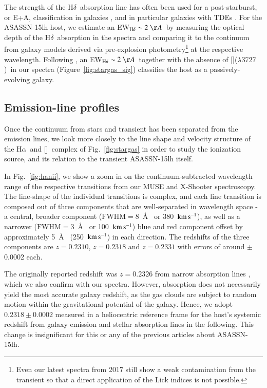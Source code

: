 \documentclass[traditabstract]{aa}
\newcommand{\kms}{$\rm{km\,s^{-1}}$}
\newcommand{\ha}{H$\alpha$}
\newcommand{\hd}{H$\delta$}
\newcommand{\oii}{[\ion{O}{ii}]}
\newcommand{\nii}{[\ion{N}{ii}]}
\begin{document}
The strength of the \hd~absorption line has often been used for a post-starburst, or E+A, classification in galaxies \citep{1999ApJS..122...51D, 1997ApJS..111..377W}, and in particular galaxies with TDEs \citep[e.g.,][]{2014ApJ...793...38A, 2016ApJ...818L..21F, 2017arXiv170701559L}. For the ASASSN-15lh host, we estimate an EW$_{\mathrm{H}\delta}\sim 2~\AA$~by measuring the optical depth of the \hd~absorption in the spectra and comparing it to the continuum from galaxy models derived via pre-explosion photometry\footnote{Even our latest spectra from 2017 still show a weak contamination from the transient so that a direct application of the Lick indices is not possible.} at the respective wavelength. Following \citet{1992ApJS...78....1D}, an EW$_{\mathrm{H}\delta}\sim2~\AA$~together with the absence of \oii($\lambda 3727$)~in our spectra (Figure~\ref{fig:stargas_sig}) classifies the host as a passively-evolving galaxy.



\subsection{Emission-line profiles}
\label{sec:prof}

Once the continuum from stars and transient has been separated from the emission lines, we look more closely to the line shape and velocity structure of the \ha\, and \nii\, complex of Fig.~\ref{fig:stargas} in order to study the ionization source, and its relation to the transient ASASSN-15lh itself.

In Fig.~\ref{fig:hanii}, we show a zoom in on the continuum-subtracted wavelength range of the respective transitions from our MUSE and X-Shooter spectroscopy. The line-shape of the individual transitions is complex, and each line transition is composed out of three components that are well-separated in wavelength space - a central, broader component ($\mathrm{FWHM}=8$~\AA~ or 380~\kms), as well as a narrower ($\mathrm{FWHM}=3$~\AA~ or 100~\kms) blue and red component offset by approximately 5~\AA~ (250~\kms) in each direction. The redshifts of the three components are $z=0.2310$, $z=0.2318$ and $z=0.2331$ with errors of around $\pm$0.0002 each. 

The originally reported redshift was $z=0.2326$ from narrow  absorption lines \citep{2015ATel.7774....1D}, which we also confirm with our spectra. However,  absorption does not necessarily yield the most accurate galaxy redshift, as the  gas clouds are subject to random motion within the gravitational potential of the galaxy. Hence, we adopt $0.2318\pm0.0002$ measured in a heliocentric reference frame for the host's systemic redshift from galaxy emission and stellar absorption lines in the following. This change is insignificant for this or any of the previous articles about ASASSN-15lh.
\end{document}

